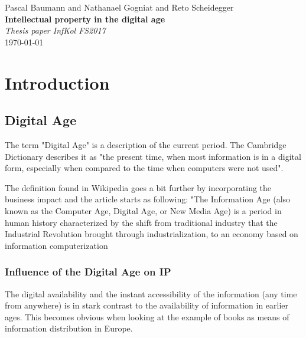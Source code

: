 \documentclass[a4paper]{report}
\newcommand*{\titleAP}{\begingroup %
	\centering
	\vspace*{\baselineskip} %
	
	{\Large Pascal Baumann} and {\Large Nathanael Gogniat} and {\Large Reto Scheidegger}\\[0.167\textheight] %
	
	{\Huge\bfseries Intellectual property in the digital age}\\[\baselineskip]
	
	{\Large \textit{Thesis paper InfKol FS2017}}\\
	\today
	
	\vspace*{3\baselineskip} %
	\endgroup}
\begin{document}
\titleAP

\begin{abstract}
	\blindtext
	
\end{abstract}
\newpage

\tableofcontents

\newpage

\chapter{Introduction}
\label{ch:Intro}

\section{Digital Age}
\label{sec:Digital age}
The term "Digital Age" is a description of the current period. The Cambridge Dictionary describes it as "the present time, when most information is in a digital form, especially when compared to the time when computers were not used". \parencite{CambridgeUniversityPress2014}

The definition found in Wikipedia goes a bit further by incorporating the business impact and the article starts as following: "The Information Age (also known as the Computer Age, Digital Age, or New Media Age) is a period in human history characterized by the shift from traditional industry that the Industrial Revolution brought through industrialization, to an economy based on information computerization \parencite{WikiInfoAge2017}

\subsection{Influence of the Digital Age on IP}
The digital availability and the instant accessibility of the information (any time from anywhere) is in stark contrast to the availability of information in earlier ages. This becomes obvious when looking at the example of books as means of information distribution in Europe.
\end{document}
